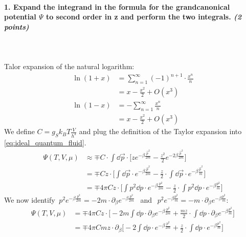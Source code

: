 \paragraph{1. Expand the integrand in the formula for the 
    grandcanonical potential $\Psi$ to second order in z 
    and perform the two integrals. \textit{(2 points)}
} \ \\
    \\
    Talor expansion of the natural logarithm:
    \begin{align}
        \ln(1+x)
        &=\sum_{n=1}^\infty(-1)^{n+1}\cdot\frac{x^n}{n} \\
        &=x-\frac{x^2}{2}+O(x^3) \\
        \ln(1-x)
        &=-\sum_{n=1}^\infty\frac{x^n}{n} \\
        &=x-\frac{x^2}{2}+O(x^3)
    \end{align}
    We define $C=g_Sk_BT\frac{V}{h^3}$ and plug the 
    definition of the Taylor expansion into 
    \autoref{eq:ideal_quantum_fluid}.
    \begin{align}
        \Psi(T,V,\mu)
        &\approx\mp C\cdot
        \int\dd\vec p\cdot\bigg[
            ze^{-\beta\frac{\vec p^2}{2m}}
            -\frac{z^2}{2}e^{-2\beta\frac{\vec p^2}{2m}}
        \bigg] \\
        &=\mp Cz\cdot\bigg[
            \int\dd\vec p\cdot
                e^{-\beta\frac{\vec p^2}{2m}}
            -\frac{z}{2}\cdot\int\dd\vec p\cdot
                e^{-\beta\frac{\vec p^2}{m}}
        \bigg] \\
        &=\mp 4\pi Cz\cdot\bigg[
            \int p^2\dd p\cdot
                e^{-\beta\frac{p^2}{2m}}
            -\frac{z}{2}\cdot\int p^2\dd p\cdot
                e^{-\beta\frac{p^2}{m}}
        \bigg]
    \end{align}
    We now identify $\ p^2e^{-\beta\frac{p^2}{2m}}
    =-2m\cdot\partial_\beta e^{-\beta\frac{p^2}{2m}}\ \ $
    and $\ \ p^2e^{-\beta\frac{p^2}{m}}
    =-m\cdot\partial_\beta e^{-\beta\frac{p^2}{m}}$:
    \begin{align}
        \Psi(T,V,\mu)
        &=\mp 4\pi Cz\cdot\bigg[
            -2m\int \dd p\cdot\partial_\beta
                e^{-\beta\frac{p^2}{2m}}
            +\frac{mz}{2}\cdot\int \dd p\cdot\partial_\beta
                e^{-\beta\frac{p^2}{m}}
        \bigg] \\
        &=\mp 4\pi Cmz\cdot\partial_\beta\bigg[
            -2\int \dd p\cdot
                e^{-\beta\frac{p^2}{2m}}
            +\frac{z}{2}\cdot\int \dd p\cdot
                e^{-\beta\frac{p^2}{m}}
        \bigg]
    \end{align}
